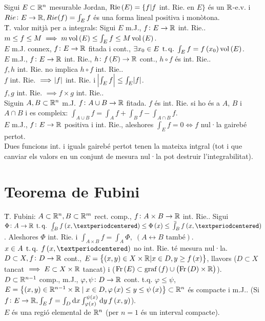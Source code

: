 \ci Sigui $E\subset\mathbb{R}^n$ mesurable Jordan, $\operatorname{Rie}\left( E \right) = \{f | f$ int. Rie. en $E \}$ és un $\mathbb{R}$-e.v. i $Rie\colon E \to \mathbb{R}, Rie(f) = \int_E f$ és una forma lineal positiva i monòtona. \\
\u{T. valor mitjà per a integrals}: Sigui $E$ m.J., $f\colon E\to\mathbb{R}$ int. Rie.. $m\leq f\leq M \implies m\operatorname{vol}\left( E \right)\leq \int_E f\leq M\operatorname{vol}\left( E \right)$. \\
\ci $E$ m.J. connex, $f\colon E\to\mathbb{R}$ fitada i cont., $\exists x_0 \in E \operatorname{\;t.q.\;} \int_E f = f\left( x_0 \right)\operatorname{vol}\left( E \right)$. \\
\ci $E$ m.J., $f\colon E\to \mathbb{R}$ int. Rie., $h \colon f\left( E \right) \to \mathbb{R}$ cont., $h\circ f$ és int. Rie.. \\
\ci $f, h$ int. Rie. no implica $h\circ f$ int. Rie.. \\
\ci $f$ int. Rie. $\implies \abs{f}$ int. Rie. i $\abs{\int_E f} \leq \int_E \abs{f}$. \\
\ci $f, g$ int. Rie. $\implies f\times g$ int. Rie.. \\
\ci Siguin $A,B\subset\mathbb{R}^n$ m.J. $f\colon A\cup B\to \mathbb{R}$ fitada. $f$ és int. Rie. si ho és a $A$, $B$ i $A\cap B$  i es compleix: $\int_{A\cup B} f= \int_A f + \int_B f - \int_{A\cap B} f$. \\
\ci $E$ m.J., $f\colon E \to \mathbb{R}$ positiva i int. Rie., aleshores $\int_E f=0 \iff f$ nul·la gairebé pertot. \\
\ci Dues funcions int. i iguals gairebé pertot tenen la mateixa intgral (tot i que canviar els valors en un conjunt de mesura nul·la pot destruir l'integrabilitat).

\section{Teorema de Fubini}

\u{T. Fubini}: $A\subset\mathbb{R}^n, B \subset \mathbb{R}^m$ rect. comp., $f\colon A\times B \to \mathbb{R}$ int. Rie.. Sigui $\Phi\colon A\to\real \tq \lowint_B f\left( x,· \right) \leq \Phi\left( x \right) \leq \upint_B f\left( x, · \right)$. Aleshores $\Phi$ int. Rie. i $\int_{A\times B} f = \int_A \Phi,\; \left( A \leftrightarrow B \text{ també}\right)$. \\
\ci $x \in A \tq f\left( x, · \right)$ no int. Rie. té mesura nul·la. \\
\ci $D\subset X, f\colon D\to \mathbb{R}$ cont., $E = \left\{ \left( x, y  \right)\in X\times \mathbb{R} | x\in D, y \geq f\left( x \right) \right\}$, llavors ($D\subset X$ tancat $\implies E\subset X\times\mathbb{R}$ tancat) i ($\operatorname{Fr}\left( E \right) \subset \operatorname{graf}\left( f \right) \cup \left( \operatorname{Fr}\left( D \right)\times \mathbb{R}  \right)$). \\
\ci $D\subset \mathbb{R}^{n-1}$ comp., m.J., $\varphi, \psi\colon D\to \mathbb{R}$ cont. t.q. $\varphi \leq \psi$, $E = \left\{ \left( x,y \right)\in\mathbb{R}^{n-1}\times \mathbb{R}\;|\; x\in D, \varphi\left( x \right) \leq y \leq \psi\left( x \right) \right\} \subset \mathbb{R}^n$ és compacte i m.J.. (Si $f\colon E\to \mathbb{R}, \int_E f = \int_D \text{d}x\int_{\varphi\left( x \right)}^{\psi\left( x \right)}\text{d}y\, f\left( x, y \right)$). \\
\ci $E$ és una regió elemental de $\mathbb{R}^n$ (per $n=1$ és un interval compacte).


